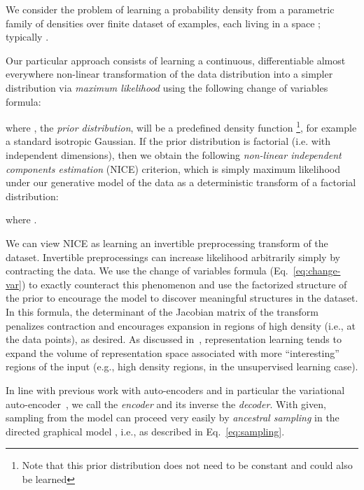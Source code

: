 \documentclass{article}
\begin{document}
We consider the problem of learning a probability density from a parametric family of
densities  over finite dataset  of 
examples, each living in a space ; typically .




Our particular approach consists of learning a continuous, differentiable
almost everywhere non-linear transformation  of the data distribution
into a simpler distribution via {\em maximum likelihood}
using the following change of variables formula:

where , the \textit{prior distribution},
will be a predefined density function
\footnote{Note that this prior distribution
does not need to be constant and could also be learned}, 
for example a
standard isotropic Gaussian.
If the prior distribution is factorial (i.e. with independent dimensions), then we obtain the following
\textit{non-linear independent components estimation} (NICE) criterion, which is simply maximum likelihood under our generative model of the data as a deterministic transform of a factorial distribution:

where .

We can view NICE as learning an invertible preprocessing transform of the dataset.
Invertible preprocessings can increase likelihood arbitrarily simply 
by contracting the data.  We use the change of variables formula 
(Eq.~\ref{eq:change-var}) to exactly counteract this phenomenon and use
the factorized structure of the prior  to encourage 
the model to discover meaningful structures in the dataset.
In this formula, the determinant of the Jacobian matrix of the transform 
 penalizes contraction and encourages expansion in regions of high density
(i.e., at the data points), as desired.  As discussed in~\citet{Bengio-et-al-ICML2013},
representation learning tends to expand the volume of representation space associated
with more ``interesting'' regions of the input (e.g., high density regions,
in the unsupervised learning case).





In line with previous work with auto-encoders and in particular
the variational auto-encoder~\citep{Kingma+Welling-ICLR2014,
Rezende-et-al-arxiv2014,Mnih+Gregor-ICML2014,Gregor-et-al-ICML2014}, 
we call  the {\em encoder} and its inverse 
the {\em decoder}. With  given, sampling from the model can proceed very easily
by {\em ancestral sampling} in the directed graphical model , i.e.,
as described in Eq.~\ref{eq:sampling}.
\end{document}
